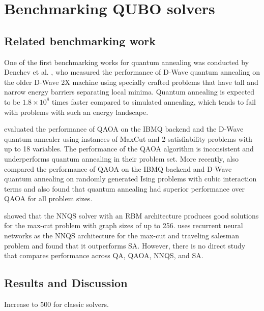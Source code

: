 \chapter{Benchmarking QUBO solvers}\label{benchmark}

\section{Related benchmarking work}
One of the first benchmarking works for quantum annealing was conducted by Denchev et al. , who measured the performance of D-Wave quantum annealing on the older D-Wave 2X machine using specially crafted problems that have tall and narrow energy barriers separating local minima. Quantum annealing is expected to be $1.8 \times 10^8$ times faster compared to simulated annealing, which tends to fail with problems with such an energy landscape.


 evaluated the performance of QAOA on the IBMQ backend and the D-Wave quantum annealer using instances of MaxCut and 2-satisfiability problems with up to 18 variables. The performance of the QAOA algorithm is inconsistent and underperforms quantum annealing in their problem set. More recently,  also compared the performance of QAOA on the IBMQ backend and D-Wave quantum annealing on randomly generated Ising problems with cubic interaction terms and also found that quantum annealing had superior performance over QAOA for all problem sizes. 

 showed that the NNQS solver with an RBM architecture produces good solutions for the max-cut problem with graph sizes of up to 256.  uses recurrent neural networks as the NNQS architecture for the max-cut and traveling salesman problem and found that it outperforms SA. However, there is no direct study that compares performance across QA, QAOA, NNQS, and SA.

\section{Results and Discussion}
Increase to 500 for classic solvers.

